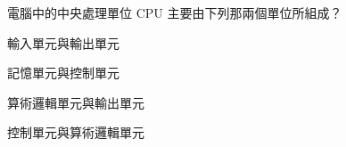 \ifx\ntpcNinetyThree\undefined[93學年基北區] \fi
電腦中的中央處理單位 CPU 主要由下列那兩個單位所組成？
  \begin{optionlist}
  \item 輸入單元與輸出單元
  \item 記憶單元與控制單元
  \item 算術邏輯單元與輸出單元
  \item 控制單元與算術邏輯單元\label{ntpc-93-a4}
  \end{optionlist}